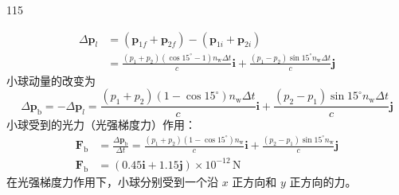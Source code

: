 \begin{solution}{115}
\begin{subsolution}
\begin{equation}
            \begin{aligned}
                \Delta \boldsymbol{p}_{l} &= (\boldsymbol{p}_{1f} + \boldsymbol{p}_{2f}) - (\boldsymbol{p}_{1i} + \boldsymbol{p}_{2i}) \\
                &= \frac{(p_{1} + p_{2}) (\cos 15^{\circ} - 1) n_{\mathrm{w}} \Delta t}{c} \boldsymbol{i} + \frac{(p_{1} - p_{2}) \sin 15^{\circ} n_{\mathrm{w}} \Delta t}{c} \boldsymbol{j}
            \end{aligned}
            \label{eq:17.s115}
        \end{equation}
        小球动量的改变为
        \begin{equation}
            \Delta \boldsymbol{p}_{\mathrm{b}} = - \Delta \boldsymbol{p}_{l} = \frac{(p_{1} + p_{2}) (1 - \cos 15^{\circ}) n_{\mathrm{w}} \Delta t}{c} \boldsymbol{i} + \frac{(p_{2} - p_{1}) \sin 15^{\circ} n_{\mathrm{w}} \Delta t}{c} \boldsymbol{j}
            \label{eq:18.s115}
        \end{equation}
        小球受到的光力（光强梯度力）作用：
        \begin{equation}
            \begin{aligned}
                \boldsymbol{F}_{\mathrm{b}} &= \frac{\Delta \boldsymbol{p}_{\mathrm{b}}}{\Delta t} = \frac{(p_{1} + p_{2}) (1 - \cos 15^{\circ}) n_{\mathrm{w}}}{c} \boldsymbol{i} + \frac{(p_{2} - p_{1}) \sin 15^{\circ} n_{\mathrm{w}}}{c} \boldsymbol{j} \\
                \boldsymbol{F}_{\mathrm{b}} &= (0.45 \boldsymbol{i} + 1.15 \boldsymbol{j}) \times 10^{-12} \,\mathrm{N}
            \end{aligned}
            \label{eq:19.s115}
        \end{equation}
        在光强梯度力作用下，小球分别受到一个沿 $x$ 正方向和 $y$ 正方向的力。


\end{subsolution}
\end{solution}
